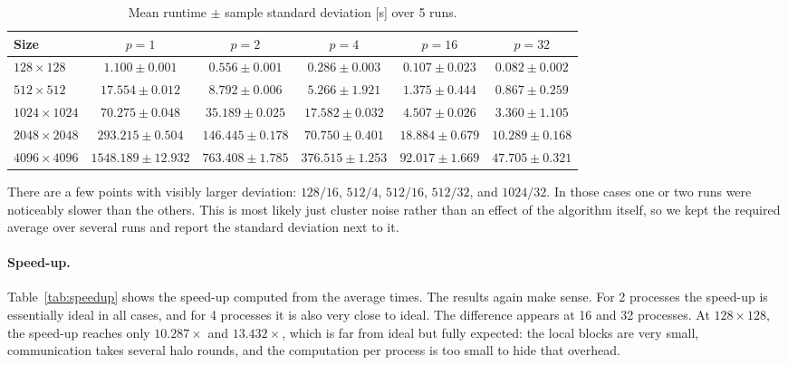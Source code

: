 \documentclass[10pt,a4paper]{article}
\begin{document}
\begin{table}[h]
    \centering
    \caption{Mean runtime $\pm$ sample standard deviation [s] over 5 runs.}
    \label{tab:times}
    \scriptsize
    \setlength{\tabcolsep}{4pt}
    \renewcommand{\arraystretch}{1.15}
    \begin{tabular}{>{\raggedright\arraybackslash}p{1.5cm}ccccc}
        \toprule
        Size & $p=1$ & $p=2$ & $p=4$ & $p=16$ & $p=32$ \\
        \midrule
        $128\times128$   & $1.100 \pm 0.001$   & $0.556 \pm 0.001$   & $0.286 \pm 0.003$   & $0.107 \pm 0.023$   & ${\bm{0.082 \pm 0.002}}$ \\
        $512\times512$   & $17.554 \pm 0.012$  & $8.792 \pm 0.006$   & $5.266 \pm 1.921$   & $1.375 \pm 0.444$   & ${\bm{0.867 \pm 0.259}}$ \\
        $1024\times1024$ & $70.275 \pm 0.048$  & $35.189 \pm 0.025$  & $17.582 \pm 0.032$  & $4.507 \pm 0.026$   & ${\bm{3.360 \pm 1.105}}$ \\
        $2048\times2048$ & $293.215 \pm 0.504$ & $146.445 \pm 0.178$ & $70.750 \pm 0.401$  & $18.884 \pm 0.679$  & ${\bm{10.289 \pm 0.168}}$ \\
        $4096\times4096$ & $1548.189 \pm 12.932$ & $763.408 \pm 1.785$ & $376.515 \pm 1.253$ & $92.017 \pm 1.669$ & ${\bm{47.705 \pm 0.321}}$ \\
        \bottomrule
    \end{tabular}
\end{table}

There are a few points with visibly larger deviation: $128/16$, $512/4$, $512/16$, $512/32$, and $1024/32$. In those cases one or two runs were noticeably slower than the others. This is most likely just cluster noise rather than an effect of the algorithm itself, so we kept the required average over several runs and report the standard deviation next to it.

\paragraph{Speed-up.}
Table~\ref{tab:speedup} shows the speed-up computed from the average times. The results again make sense. For 2 processes the speed-up is essentially ideal in all cases, and for 4 processes it is also very close to ideal. The difference appears at 16 and 32 processes. At $128\times 128$, the speed-up reaches only $10.287\times$ and $13.432\times$, which is far from ideal but fully expected: the local blocks are very small, communication takes several halo rounds, and the computation per process is too small to hide that overhead.
\end{document}
